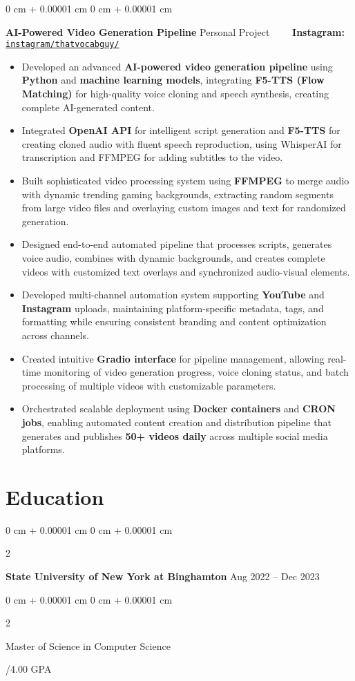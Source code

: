 \documentclass[10pt, letterpaper]{article}
\newenvironment{highlights}{
    \begin{itemize}[
        topsep=0.10 cm,
        parsep=0.10 cm,
        partopsep=0pt,
        itemsep=0pt,
        leftmargin=0 cm + 10pt
    ]
}{
    \end{itemize}
} %
\newenvironment{onecolentry}{
    \begin{adjustwidth}{
        0 cm + 0.00001 cm
    }{
        0 cm + 0.00001 cm
    }
}{
    \end{adjustwidth}
} %
\newenvironment{twocolentry}[2][]{
    \onecolentry
    \def\secondColumn{#2}
    \setcolumnwidth{\fill, 4.5 cm}
    \begin{paracol}{2}
}{
    \switchcolumn \raggedleft \secondColumn
    \end{paracol}
    \endonecolentry
} %
\begin{document}
\begin{onecolentry}
	\textbf{AI-Powered Video Generation Pipeline} \hfill Personal Project \ \ \ \ \textbf{Instagram:} \href{https://www.instagram.com/thatvocabguy/}{\texttt{instagram/thatvocabguy/}}
	\begin{highlights}
		\item Developed an advanced \textbf{AI-powered video generation pipeline} using \textbf{Python} and \textbf{machine learning models}, integrating \textbf{F5-TTS (Flow Matching)} for high-quality voice cloning and speech synthesis, creating complete AI-generated content.
		\item Integrated \textbf{OpenAI API} for intelligent script generation and \textbf{F5-TTS} for creating cloned audio with fluent speech reproduction, using WhisperAI for transcription and FFMPEG for adding subtitles to the video.
		\item Built sophisticated video processing system using \textbf{FFMPEG} to merge audio with dynamic trending gaming backgrounds, extracting random segments from large video files and overlaying custom images and text for randomized generation.
		\item Designed end-to-end automated pipeline that processes scripts, generates voice audio, combines with dynamic backgrounds, and creates complete videos with customized text overlays and synchronized audio-visual elements.
		\item Developed multi-channel automation system supporting \textbf{YouTube} and \textbf{Instagram} uploads, maintaining platform-specific metadata, tags, and formatting while ensuring consistent branding and content optimization across channels.
		\item Created intuitive \textbf{Gradio interface} for pipeline management, allowing real-time monitoring of video generation progress, voice cloning status, and batch processing of multiple videos with customizable parameters.
		\item Orchestrated scalable deployment using \textbf{Docker containers} and \textbf{CRON jobs}, enabling automated content creation and distribution pipeline that generates and publishes \textbf{50+ videos daily} across multiple social media platforms.
	\end{highlights}
\end{onecolentry}






\section{Education}
\begin{twocolentry}{
		Aug 2022 – Dec 2023
	}
	\textbf{State University of New York at Binghamton}\end{twocolentry}

\begin{twocolentry}{
		3.44/4.00 GPA
	}
	Master of Science in Computer Science
\end{twocolentry}
\end{document}
